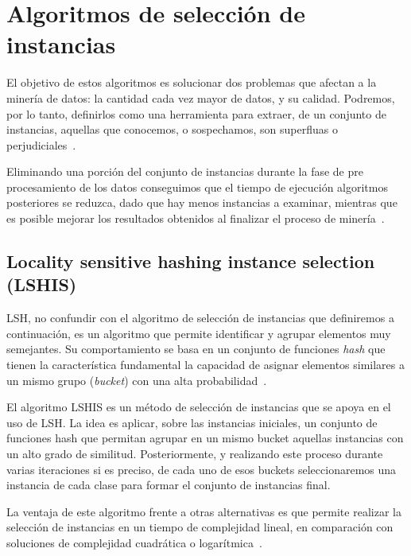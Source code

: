 \section{Algoritmos de selección de instancias}\label{sec:DefAlgSel}

El objetivo de estos algoritmos es solucionar dos problemas que afectan a la minería de datos: la cantidad cada vez mayor de datos, y su calidad. Podremos, por lo tanto,  definirlos como una herramienta para extraer, de un conjunto de instancias, aquellas que conocemos, o sospechamos, son superfluas o perjudiciales~\cite{IntroInstanceSelect}.

Eliminando una porción del conjunto de instancias durante la fase de pre procesamiento de los datos conseguimos que el tiempo de ejecución algoritmos posteriores se reduzca, dado que hay menos instancias a examinar, mientras que es posible mejorar los resultados obtenidos al finalizar el proceso de minería~\cite{IntroInstanceSelect}.

\subsection{Locality sensitive hashing instance selection (LSHIS)}\label{sec:defLSHIS}

LSH, no confundir con el algoritmo de selección de instancias que definiremos a continuación, es un algoritmo que permite identificar y agrupar elementos muy semejantes. Su comportamiento se basa en un conjunto de funciones \textit{hash} que tienen la característica fundamental la capacidad de asignar elementos similares a un mismo grupo (\textit{bucket}) con una alta probabilidad~\cite{LSHISPaper}.

El algoritmo LSHIS es un método de selección de instancias que se apoya en el uso de LSH. La idea es aplicar, sobre las instancias iniciales, un conjunto de funciones hash que permitan agrupar en un mismo bucket aquellas instancias con un alto grado de similitud. Posteriormente, y realizando este proceso durante varias iteraciones si es preciso, de cada uno de esos buckets seleccionaremos una instancia de cada clase para formar el conjunto de instancias final. 

La ventaja de este algoritmo frente a otras alternativas es que permite realizar la selección de instancias en un tiempo de complejidad lineal, en comparación con soluciones de complejidad cuadrática o logarítmica~\cite{LSHISPaper}.


